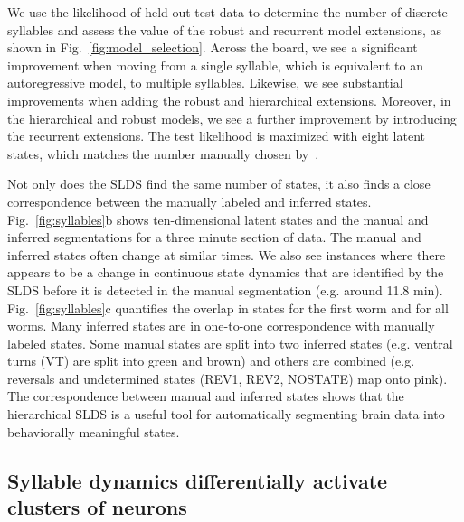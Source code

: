 \documentclass[11pt]{article}
\begin{document}
We use the likelihood of held-out test data to determine the number of
discrete syllables and assess the value of the robust and recurrent
model extensions, as shown in Fig.~\ref{fig:model_selection}.  Across
the board, we see a significant improvement when moving from a single
syllable, which is equivalent to an autoregressive model, to multiple
syllables.  Likewise, we see substantial improvements when adding the
robust and hierarchical extensions.  Moreover, in the hierarchical and
robust models, we see a further improvement by introducing the
recurrent extensions.  The test likelihood is maximized with
eight latent states, which matches the number manually chosen
by~\citet{kato2015global}.

Not only does the SLDS find the same number of states, it also finds a
close correspondence between the manually labeled and inferred states.
Fig.~\ref{fig:syllables}b shows ten-dimensional latent states and the
manual and inferred segmentations for a three minute section of data.
The manual and inferred states often change at similar times. We also
see instances where there appears to be a change in continuous state
dynamics that are identified by the SLDS before it is detected in the
manual segmentation (e.g. around 11.8 min).  Fig.~\ref{fig:syllables}c
quantifies the overlap in states for the first worm and for all worms.
Many inferred states are in one-to-one correspondence with manually
labeled states. Some manual states are split into two inferred states
(e.g. ventral turns (\textsf{VT}) are split into green and brown) and
others are combined (e.g. reversals and undetermined states
(\textsf{REV1}, \textsf{REV2}, \textsf{NOSTATE}) map onto pink).
The correspondence between manual and inferred states shows that
the hierarchical SLDS is a useful tool for automatically segmenting
brain data into behaviorally meaningful states.


\subsection*{Syllable dynamics differentially activate clusters of neurons}
\end{document}
